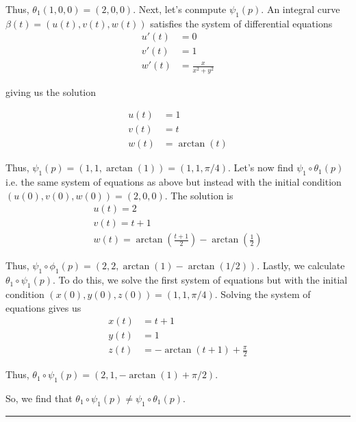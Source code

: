 \documentclass{article}
\begin{document}
Thus, $\theta_1(1, 0, 0) = (2, 0, 0)$. Next, let's conmpute $\psi_1(p)$. An integral curve $\beta(t) = \left(u(t), v(t), w(t)\right)$ satisfies the system of differential equations
\begin{align*}
  u'(t) &= 0\\
  v'(t) &= 1 \\
  w'(t) &= \frac{x}{x^2 + y^2}
\end{align*}

giving us the solution 

\begin{align*}
  u(t) &= 1 \\
  v(t) &= t \\
  w(t) &= \arctan(t)
\end{align*}

Thus, $\psi_1(p) = (1, 1, \arctan(1)) = (1,1,\pi/4)$. Let's now find $\psi_1 \circ \theta_1(p)$ i.e. the same system of equations as above but instead with the initial condition $\left(u(0), v(0), w(0)\right) = (2, 0, 0)$. The solution is
\begin{align*}
  u(t) = 2 \\
  v(t) = t+1 \\
  w(t) = \arctan\left(\frac{t+1}{2}\right) - \arctan\left(\frac{1}{2}\right)
\end{align*}

Thus, $\psi_1 \circ \phi_1(p) = \left(2, 2, \arctan(1) - \arctan(1/2)\right)$. Lastly, we calculate $\theta_1 \circ \psi_1(p)$. To do this, we solve the first system of equations but with the initial condition $(x(0), y(0), z(0)) = (1, 1, \pi/4)$. Solving the system of equations gives us 
\begin{align*}
  x(t) &= t + 1 \\
  y(t) &= 1 \\
  z(t) &= -\arctan(t+1) + \frac{\pi}{2} 
\end{align*}

Thus, $\theta_1 \circ \psi_1(p) = \left(2, 1, -\arctan(1) + \pi/2 \right)$.

So, we find that $\theta_1 \circ \psi_1(p) \neq \psi_1 \circ \theta_1(p)$.

\vskip 0.5cm
\hrule 
\vskip 0.5cm
\end{document}
